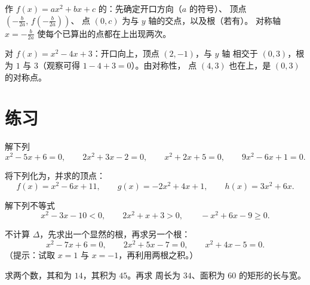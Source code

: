 \begin{method}[抛物线的作图]\label{met:g11:quad:reading}
作 $f(x) = ax^2+bx+c$ 的：先确定开口方向（$a$ 的符号）、
顶点 $\left(-\frac{b}{2a},\, f\!\left(-\frac{b}{2a}\right)\right)$、
点 $(0, c)$ 为与 $y$ 轴的交点，以及根（若有）。
对称轴 $x = -\frac{b}{2a}$ 使每个已算出的点都在上出现两次。
\end{method}

\begin{example}
对 $f(x) = x^2 - 4x + 3$：开口向上，顶点 $(2, -1)$，与 $y$ 轴
相交于 $(0,3)$，根为 $1$ 与 $3$（观察可得 $1 - 4 + 3 = 0$）。由对称性，
点 $(4, 3)$ 也在上，是 $(0, 3)$ 的对称点。
\end{example}

\section{练习}

\begin{exercise}[$\star$]\label{exo:g11:quad:1}
解下列
\[
x^2 - 5x + 6 = 0, \qquad
2x^2 + 3x - 2 = 0, \qquad
x^2 + 2x + 5 = 0, \qquad
9x^2 - 6x + 1 = 0 .
\]
\end{exercise}

\begin{exercise}[$\star$]\label{exo:g11:quad:2}
将下列化为，并求的顶点：
\[
f(x) = x^2 - 6x + 11, \qquad
g(x) = -2x^2 + 4x + 1, \qquad
h(x) = 3x^2 + 6x .
\]
\end{exercise}

\begin{exercise}[$\star$]\label{exo:g11:quad:3}
解下列不等式
\[
x^2 - 3x - 10 < 0, \qquad
2x^2 + x + 3 > 0, \qquad
-x^2 + 6x - 9 \geq 0 .
\]
\end{exercise}

\begin{exercise}[$\star$]\label{exo:g11:quad:4}
不计算 $\Delta$，先求出一个显然的根，再求另一个根：
\[
x^2 - 7x + 6 = 0, \qquad
2x^2 + 5x - 7 = 0, \qquad
x^2 + 4x - 5 = 0 .
\]
（提示：试取 $x = 1$ 与 $x = -1$，再利用两根之积。）
\end{exercise}

\begin{exercise}[$\star\star$]\label{exo:g11:quad:5}
求两个数，其和为 $14$，其积为 $45$。再求
周长为 $34$、面积为 $60$ 的矩形的长与宽。
\end{exercise}

